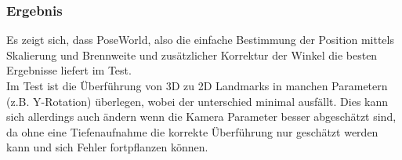 \subsubsection{Ergebnis}
Es zeigt sich, dass PoseWorld, also die einfache Bestimmung der Position mittels Skalierung und Brennweite und zusätzlicher Korrektur der Winkel die besten Ergebnisse liefert im Test.\\
Im Test ist die Überführung von 3D zu 2D Landmarks in manchen Parametern (z.B. Y-Rotation) überlegen, wobei der unterschied minimal ausfällt. Dies kann sich allerdings auch ändern wenn die Kamera Parameter besser abgeschätzt sind, da ohne eine Tiefenaufnahme die korrekte Überführung nur geschätzt werden kann und sich Fehler fortpflanzen können.